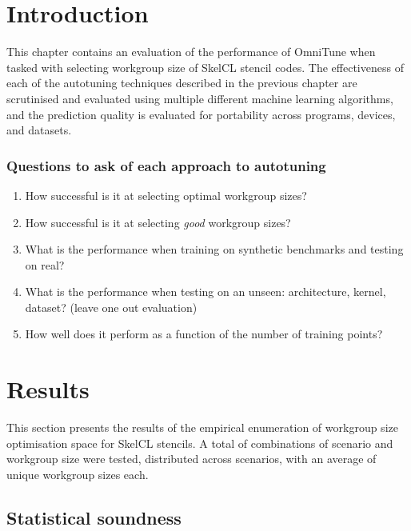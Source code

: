 \section{Introduction}

This chapter contains an evaluation of the performance of OmniTune
when tasked with selecting workgroup size of SkelCL stencil codes. The
effectiveness of each of the autotuning techniques described in the
previous chapter are scrutinised and evaluated using multiple
different machine learning algorithms, and the prediction quality is
evaluated for portability across programs, devices, and datasets.


\subsubsection{Questions to ask of each approach to autotuning}

\begin{enumerate}
\item How successful is it at selecting optimal workgroup sizes?
\item How successful is it at selecting \emph{good} workgroup sizes?
\item What is the performance when training on synthetic benchmarks
  and testing on real?
\item What is the performance when testing on an unseen: architecture,
  kernel, dataset? (leave one out evaluation)
\item How well does it perform as a function of the number of training
  points?
\end{enumerate}


\section{Results}

This section presents the results of the empirical enumeration of
workgroup size optimisation space for SkelCL stencils. A total of
 combinations of scenario and workgroup
size were tested, distributed across 
scenarios, with an average of  unique
workgroup sizes each. %

\subsection{Statistical soundness}

